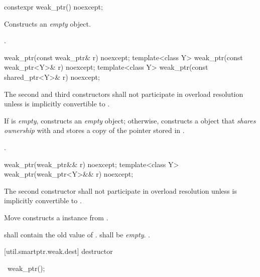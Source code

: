 %
\begin{itemdecl}
constexpr weak_ptr() noexcept;
\end{itemdecl}

\begin{itemdescr}
\pnum\effects  Constructs an \textit{empty}  object.

\pnum\postcondition  {}.
\end{itemdescr}

%
\begin{itemdecl}
weak_ptr(const weak_ptr& r) noexcept;
template<class Y> weak_ptr(const weak_ptr<Y>& r) noexcept;
template<class Y> weak_ptr(const shared_ptr<Y>& r) noexcept;
\end{itemdecl}

\begin{itemdescr}
\pnum\remark The second and third constructors shall not participate in
overload resolution unless  is implicitly convertible to .

\pnum\effects  If  is \textit{empty}, constructs
an \textit{empty}  object; otherwise, constructs
a  object that \textit{shares ownership}
with  and stores a copy of the pointer stored in .

\pnum\postcondition  {}.
\end{itemdescr}

%
\begin{itemdecl}
weak_ptr(weak_ptr&& r) noexcept;
template<class Y> weak_ptr(weak_ptr<Y>&& r) noexcept;
\end{itemdecl}

\begin{itemdescr}
\pnum\remark The second constructor shall not participate in overload resolution unless
 is implicitly convertible to .

\pnum\effects Move constructs a  instance from .

\pnum\postconditions {} shall contain the old value of .
 shall be \textit{empty}. .
\end{itemdescr}

[util.smartptr.weak.dest]{ destructor}

%
\begin{itemdecl}
~weak_ptr();
\end{itemdecl}

